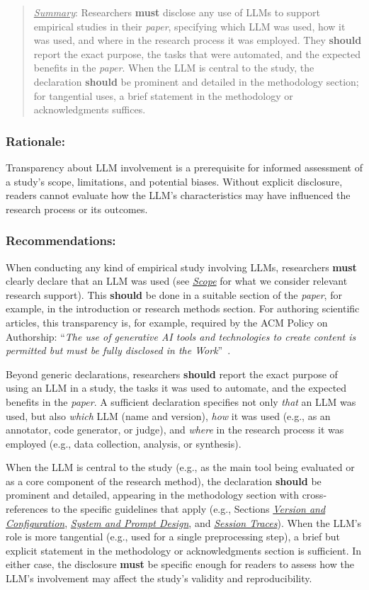 \documentclass[smallextended]{svjour3}
\newcommand*{\enq}[1]{\enquote{{\itshape#1}}}
\newcommand{\must}{\textbf{must}\xspace}
\newcommand{\should}{\textbf{should}\xspace}
\newcommand{\summary}{\underline{\emph{Summary}}\xspace}
\newcommand{\summary}{\textbf{\emph{Summary}}\xspace}
\newcommand{\paper}{\emph{paper}\xspace}
\newcommand{\paper}{\emph{paper}\xspace}
\newenvironment{framed}{\begin{quote}}{\end{quote}}
\newcommand{\scope}{\hyperref[sec:scope]{\emph{Scope}}\xspace}
\newcommand{\scope}{\href{/scope/}{\emph{Scope}}\xspace}
\newcommand{\modelversion}{\hyperref[sec:report-model-version-configuration-and-customizations]{\emph{Version and Configuration}}\xspace}
\newcommand{\design}{\hyperref[sec:report-system-and-prompt-design]{\emph{System and Prompt Design}}\xspace}
\newcommand{\traces}{\hyperref[sec:report-session-traces]{\emph{Session Traces}}\xspace}
\newcommand{\modelversion}{\href{/guidelines\#report-model-version-configuration-and-customizations}{\emph{Version and Configuration}}\xspace}
\newcommand{\design}{\href{/guidelines\#report-system-and-prompt-design}{\emph{System and Prompt Design}}\xspace}
\newcommand{\traces}{\href{/guidelines\#report-session-traces}{\emph{Session Traces}}\xspace}
\newcommand{\guidelinesubsubsection}[1]{\subsubsection{\bfseries #1:}}
\newcommand{\guidelinesubsubsection}[1]{\subsubsection{#1}}
\begin{document}
\vspace{0.5\baselineskip}
\begin{framed}
\summary: Researchers \must disclose any use of LLMs to support empirical studies in their \paper, specifying which LLM was used, how it was used, and where in the research process it was employed. They \should report the exact purpose, the tasks that were automated, and the expected benefits in the \paper. When the LLM is central to the study, the declaration \should be prominent and detailed in the methodology section; for tangential uses, a brief statement in the methodology or acknowledgments suffices. \end{framed}

\guidelinesubsubsection{Rationale}

Transparency about LLM involvement is a prerequisite for informed assessment of a study's scope, limitations, and potential biases.
Without explicit disclosure, readers cannot evaluate how the LLM's characteristics may have influenced the research process or its outcomes.

\guidelinesubsubsection{Recommendations}

When conducting any kind of empirical study involving LLMs, researchers \must clearly declare that an LLM was used (see \scope for what we consider relevant research support).
This \should be done in a suitable section of the \paper, for example, in the introduction or research methods section.
For authoring scientific articles, this transparency is, for example, required by the ACM Policy on Authorship: \enq{The use of generative AI tools and technologies to create content is permitted but must be fully disclosed in the Work}~\cite{ACM2023}.

Beyond generic declarations, researchers \should report the exact purpose of using an LLM in a study, the tasks it was used to automate, and the expected benefits in the \paper.
A sufficient declaration specifies not only \emph{that} an LLM was used, but also \emph{which} LLM (name and version), \emph{how} it was used (e.g., as an annotator, code generator, or judge), and \emph{where} in the research process it was employed (e.g., data collection, analysis, or synthesis).

When the LLM is central to the study (e.g., as the main tool being evaluated or as a core component of the research method), the declaration \should be prominent and detailed, appearing in the methodology section with cross-references to the specific guidelines that apply (e.g., Sections \modelversion, \design, and \traces).
When the LLM's role is more tangential (e.g., used for a single preprocessing step), a brief but explicit statement in the methodology or acknowledgments section is sufficient.
In either case, the disclosure \must be specific enough for readers to assess how the LLM's involvement may affect the study's validity and reproducibility.
\end{document}

